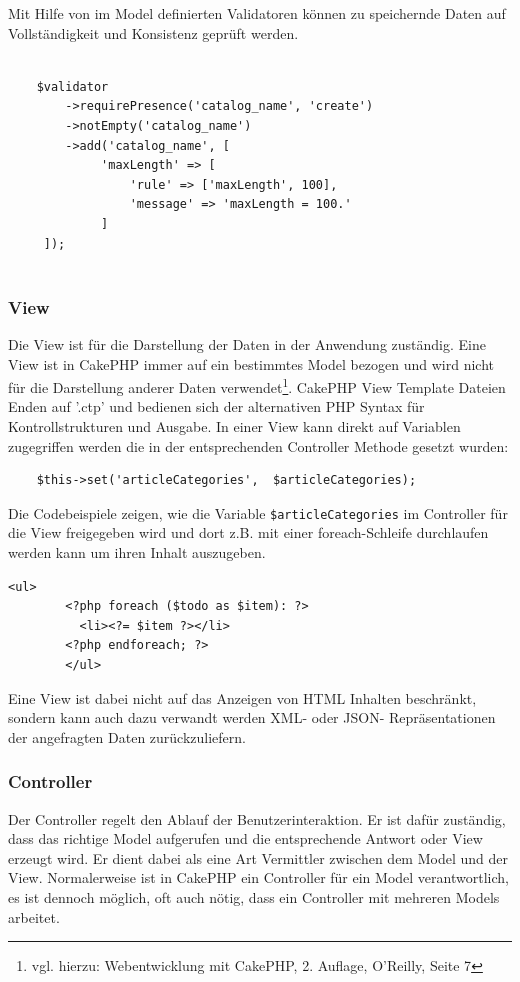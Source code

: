 	Mit Hilfe von im Model definierten Validatoren können zu speichernde Daten auf Vollständigkeit und Konsistenz geprüft werden. 

	\lstset{language=PHP}
	\begin{lstlisting}

	$validator
     	->requirePresence('catalog_name', 'create')
     	->notEmpty('catalog_name')
     	->add('catalog_name', [
	         'maxLength' => [
	             'rule' => ['maxLength', 100],
	             'message' => 'maxLength = 100.'
	         ]
     ]);
	
	\end{lstlisting}
	
	\subsubsection{View}
	
	Die View ist für die Darstellung der Daten in der Anwendung zuständig. Eine View ist in CakePHP immer auf ein bestimmtes Model bezogen und wird nicht für die Darstellung anderer Daten verwendet\footnote{vgl. hierzu: Webentwicklung mit CakePHP, 2. Auflage, O'Reilly, Seite 7}. CakePHP View Template Dateien Enden auf '.ctp' und bedienen sich der alternativen PHP Syntax für Kontrollstrukturen und Ausgabe. 
	In einer View kann direkt auf Variablen zugegriffen werden die in der entsprechenden Controller Methode gesetzt wurden:\\ 
   \lstset{language=PHP} 
	\begin{lstlisting}
	$this->set('articleCategories',  $articleCategories);
	\end{lstlisting}
	  Die Codebeispiele zeigen, wie die Variable \texttt{\$articleCategories} im Controller für die View freigegeben wird und dort z.B. mit einer foreach-Schleife durchlaufen werden kann um ihren Inhalt auszugeben. 
		\lstset{language=PHP}
		\begin{lstlisting}[caption={Alternative PHP Syntax}] 	
		<ul>
	   	<?php foreach ($todo as $item): ?>
		  <li><?= $item ?></li>
		<?php endforeach; ?>
		</ul>
		\end{lstlisting}
	 Eine View ist dabei nicht auf das Anzeigen von HTML Inhalten beschränkt, sondern kann auch dazu verwandt werden XML- oder JSON- Repräsentationen der angefragten Daten zurückzuliefern.
	\subsubsection{Controller}
	Der Controller regelt den Ablauf der Benutzerinteraktion.
	Er ist dafür zuständig, dass das richtige Model aufgerufen und die entsprechende Antwort oder View erzeugt wird. Er dient dabei als eine Art Vermittler zwischen dem Model und der View. Normalerweise ist in CakePHP ein Controller für ein Model verantwortlich, es ist dennoch möglich, oft auch nötig, dass ein Controller mit mehreren Models arbeitet.
	
